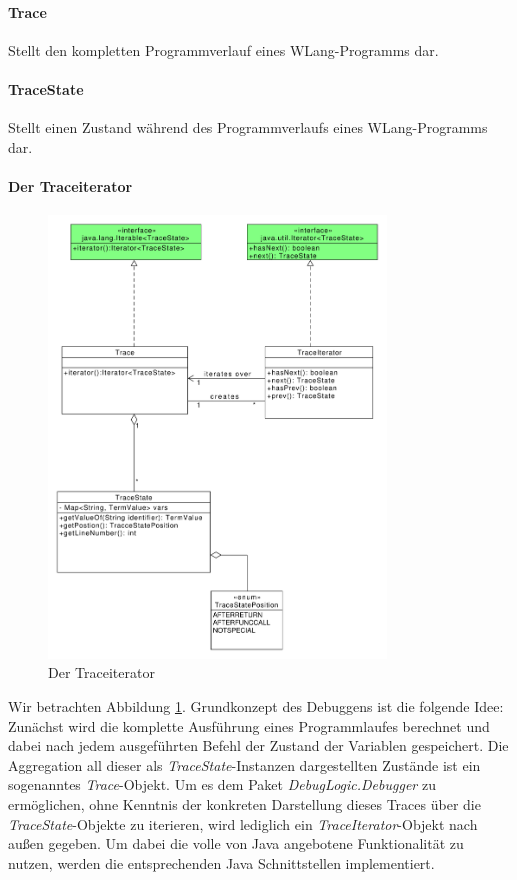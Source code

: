 \documentclass[parskip=full]{scrartcl}
\begin{document}
\paragraph{Trace}
Stellt den kompletten Programmverlauf eines WLang-Programms dar.
\paragraph{TraceState}
Stellt einen Zustand während des Programmverlaufs eines WLang-Programms dar.
\paragraph{Der Traceiterator}
\begin{figure}[!h]
\centering
\includegraphics[width=0.8\textwidth]{diagrammIdeenUmlet/TraceIteratorPattern.pdf}
\caption{Der Traceiterator}
\label{TraceIterator}
\end{figure}
Wir betrachten Abbildung \ref{TraceIterator}.
Grundkonzept des Debuggens ist die folgende Idee: Zunächst wird die komplette Ausführung eines Programmlaufes berechnet und dabei nach jedem ausgeführten Befehl der Zustand der Variablen gespeichert. Die Aggregation all dieser als \textit{TraceState}-Instanzen dargestellten Zustände ist ein sogenanntes \textit{Trace}-Objekt. Um es dem Paket \textit{DebugLogic.Debugger} zu ermöglichen, ohne Kenntnis der konkreten Darstellung dieses Traces über die \textit{TraceState}-Objekte zu iterieren, wird lediglich ein \textit{TraceIterator}-Objekt nach außen gegeben. Um dabei die volle von Java angebotene Funktionalität zu nutzen, werden die entsprechenden Java Schnittstellen implementiert. 
\end{document}
